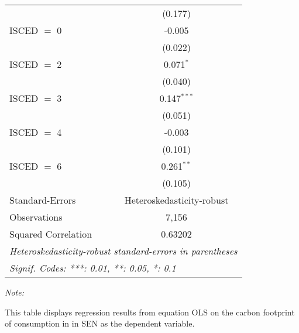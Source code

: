 \begin{table}[htbp!]
\begin{adjustbox}{width = 1\textwidth, max height = 0.95\textheight, center}
\begin{threeparttable}[b]
\begin{tabular}{lc}
                                & (0.177)\\   
            ISCED $=$ 0         & -0.005\\   
                                & (0.022)\\   
            ISCED $=$ 2         & 0.071$^{*}$\\   
                                & (0.040)\\   
            ISCED $=$ 3         & 0.147$^{***}$\\   
                                & (0.051)\\   
            ISCED $=$ 4         & -0.003\\   
                                & (0.101)\\   
            ISCED $=$ 6         & 0.261$^{**}$\\   
                                & (0.105)\\   
            \midrule 
            Standard-Errors     & Heteroskedasticity-robust \\   
            Observations        & 7,156\\  
            Squared Correlation & 0.63202\\  
            \midrule \midrule
            \multicolumn{2}{l}{\emph{Heteroskedasticity-robust standard-errors in parentheses}}\\
            \multicolumn{2}{l}{\emph{Signif. Codes: ***: 0.01, **: 0.05, *: 0.1}}\\
         \end{tabular}
         
         \begin{tablenotes}\item \medskip \textit{Note:}
            \item This table displays regression results from equation OLS on the carbon footprint of consumption in  in SEN as the dependent variable.  
         \end{tablenotes}
      \end{threeparttable}
   \end{adjustbox}
\end{table}


